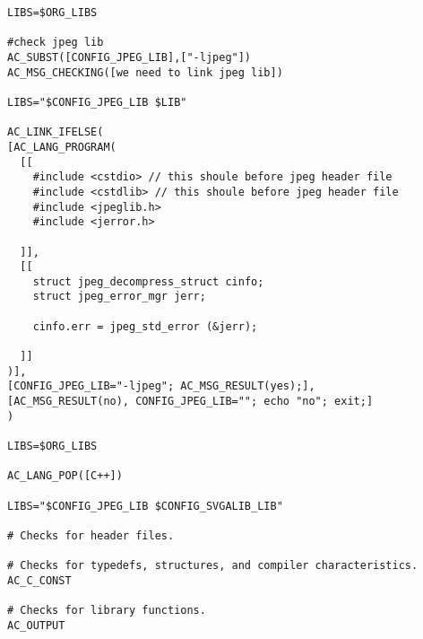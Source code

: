 \documentclass[12pt,a4]{article}
\begin{document}
\begin{CJK}{UTF8}{bsmi}
\begin{verbatim}
LIBS=$ORG_LIBS

#check jpeg lib
AC_SUBST([CONFIG_JPEG_LIB],["-ljpeg"])
AC_MSG_CHECKING([we need to link jpeg lib])

LIBS="$CONFIG_JPEG_LIB $LIB"

AC_LINK_IFELSE(
[AC_LANG_PROGRAM(
  [[
    #include <cstdio> // this shoule before jpeg header file
    #include <cstdlib> // this shoule before jpeg header file
    #include <jpeglib.h>
    #include <jerror.h>

  ]],
  [[
    struct jpeg_decompress_struct cinfo;
    struct jpeg_error_mgr jerr;

    cinfo.err = jpeg_std_error (&jerr);

  ]]
)],
[CONFIG_JPEG_LIB="-ljpeg"; AC_MSG_RESULT(yes);],
[AC_MSG_RESULT(no), CONFIG_JPEG_LIB=""; echo "no"; exit;]
)

LIBS=$ORG_LIBS

AC_LANG_POP([C++])

LIBS="$CONFIG_JPEG_LIB $CONFIG_SVGALIB_LIB"

# Checks for header files.

# Checks for typedefs, structures, and compiler characteristics.
AC_C_CONST

# Checks for library functions.
AC_OUTPUT
\end{verbatim}



\end{CJK}
\end{document}
